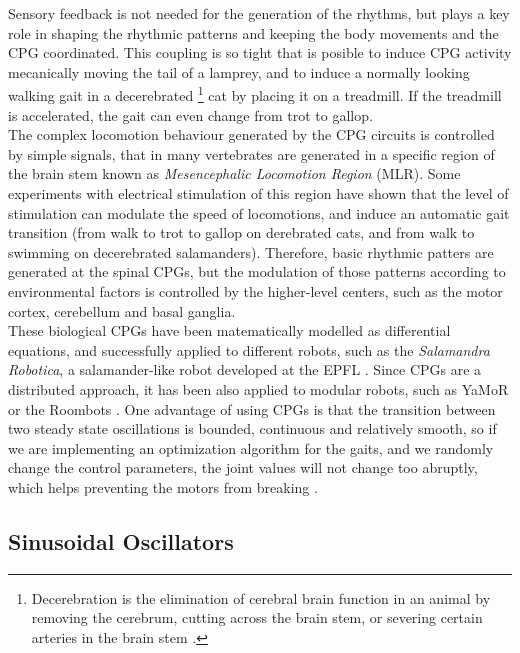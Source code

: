 Sensory feedback is not needed for the generation of the rhythms, but plays a key role in shaping the rhythmic patterns and keeping the body movements and the CPG coordinated. This coupling is so tight that is posible to induce CPG activity mecanically moving the tail of a lamprey, and to induce a normally looking walking gait in a decerebrated \footnote{Decerebration is the elimination of cerebral brain function in an animal by removing the cerebrum, cutting across the brain stem, or severing certain arteries in the brain stem \cite{decerebration}.} cat by placing it on a treadmill. If the treadmill is accelerated, the gait can even change from trot to gallop.\\

The complex locomotion behaviour generated by the CPG circuits is controlled by simple signals, that in many vertebrates are generated in a specific region of the brain stem known as \emph{Mesencephalic Locomotion Region} (MLR). Some experiments with electrical stimulation of this region have shown that the level of stimulation can modulate the speed of locomotions, and induce an automatic gait transition (from walk to trot to gallop on derebrated cats, and from walk to swimming on decerebrated salamanders). Therefore, basic rhythmic patters are generated at the spinal CPGs, but the modulation of those patterns according to environmental factors is controlled by the higher-level centers, such as the motor cortex, cerebellum and basal ganglia.\\

These biological CPGs have been matematically modelled as differential equations, and successfully applied to different robots, such as the \emph{Salamandra Robotica}, a salamander-like robot developed at the EPFL \cite{Ijspeert2007}. Since CPGs are a distributed approach, it has been also applied to modular robots, such as YaMoR \cite{Marbach2005} or the Roombots \cite{Sprowitz2010}. One advantage of using CPGs is that the transition between two steady state oscillations is bounded, continuous and relatively smooth, so if we are implementing an optimization algorithm for the gaits, and we randomly change the control parameters, the joint values will not change too abruptly, which helps preventing the motors from breaking \cite{Ijspeert2008}.\\

\subsection{Sinusoidal Oscillators}
\label{gait_sin_osc}

